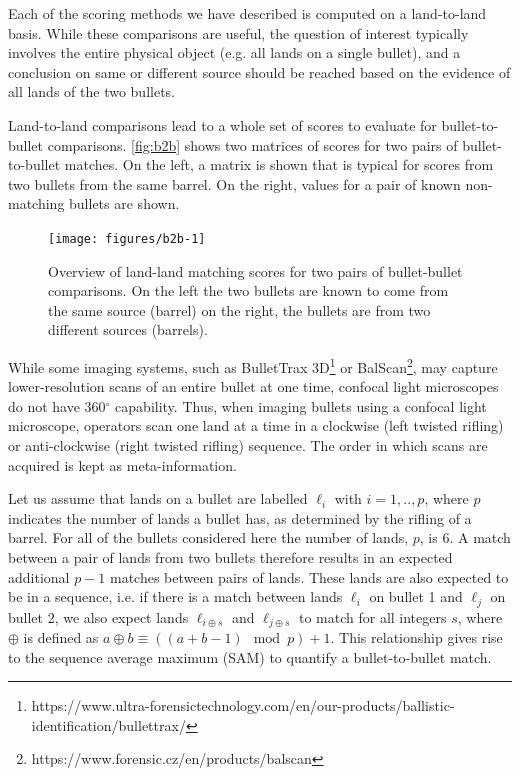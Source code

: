 \documentclass[doubleblind]{elsarticle}\usepackage[]{graphicx}\usepackage[]{color}
\newenvironment{knitrout}{}{} %
\begin{document}
Each of the scoring methods we have described is computed on a land-to-land basis. While these comparisons are useful, the question of interest typically involves the entire physical object (e.g. all lands on a single bullet), and a conclusion on same or different source should be reached based on the evidence of all lands of the two bullets.



Land-to-land comparisons lead to a whole set of scores to evaluate for bullet-to-bullet comparisons. \autoref{fig:b2b} shows two matrices of scores for two pairs of bullet-to-bullet matches. On the left, a matrix is shown that is typical for scores from two bullets from the same barrel. On the right, values for a pair of known non-matching bullets are shown.


\begin{knitrout}
\color{fgcolor}\begin{figure}

{\centering \texttt{[image: figures/b2b-1]} 

}

\caption[Overview of land-land matching scores for two pairs of bullet-bullet comparisons]{Overview of land-land matching scores for two pairs of bullet-bullet comparisons. On the left the two bullets are known to come from the same source (barrel) on the right, the bullets are from two different sources (barrels).}\label{fig:b2b}
\end{figure}


\end{knitrout}

While some imaging systems, such as BulletTrax 3D\footnote{https://www.ultra-forensictechnology.com/en/our-products/ballistic-identification/bullettrax/} or BalScan\footnote{https://www.forensic.cz/en/products/balscan}, may capture lower-resolution scans of an entire bullet at one time, confocal light microscopes do not have 360$^\circ$ capability. Thus, when imaging bullets using a confocal light microscope, operators scan one land at a time in a clockwise (left twisted rifling) or anti-clockwise (right twisted rifling) sequence. The order in which scans are acquired is kept as meta-information. 

Let us assume that lands on a bullet are labelled $\ell_i$ with $i = 1, .., p$, where $p$ indicates the number of lands a bullet has, as determined by the rifling of a barrel. For all of the bullets considered here the number of lands, $p$, is 6. A match between  a pair of lands from two bullets therefore results in an expected additional $p-1$ matches between pairs of lands. These lands are also expected to be in a sequence, i.e. if there is a match between lands $\ell_i$ on bullet 1 and $\ell_j$ on bullet 2, we also expect lands $\ell_{i\oplus s}$ and $\ell_{j\oplus s}$ to match for all integers $s$, where $\oplus$ is defined as $a \oplus b \equiv \left((a + b - 1)\mod p\right) + 1$. This relationship gives rise to the sequence average maximum (SAM) to quantify a bullet-to-bullet match. 
\end{document}
